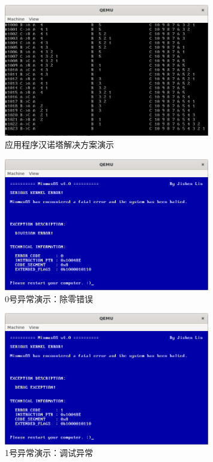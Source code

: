 \begin{figure}[htbp]
    \centering
    \includegraphics[width=0.8\textwidth]{figures/ApplicationHanoiPresentation.png}
    \caption{应用程序汉诺塔解决方案演示}
\end{figure}

\begin{figure}[htbp]
    \centering
    \includegraphics[width=0.8\textwidth]{figures/Exception0Presentation.png}
    \caption{0号异常演示：除零错误}
\end{figure}

\begin{figure}[htbp]
    \centering
    \includegraphics[width=0.8\textwidth]{figures/Exception1Presentation.png}
    \caption{1号异常演示：调试异常}
\end{figure}

